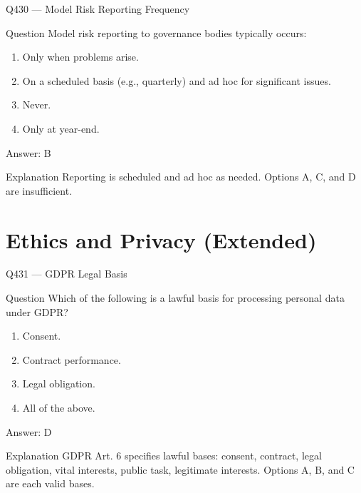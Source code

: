 \documentclass[aspectratio=169,8pt]{beamer}
\begin{document}
	\begin{frame}{Q430 --- Model Risk Reporting Frequency}
		\begin{block}{Question}
			Model risk reporting to governance bodies typically occurs:
			\begin{enumerate}
				\item Only when problems arise.
				\item On a scheduled basis (e.g., quarterly) and ad hoc for significant issues.
				\item Never.
				\item Only at year-end.
			\end{enumerate}
		\end{block}
		\begin{exampleblock}{Answer: B}\end{exampleblock}
		\begin{block}{Explanation}
			Reporting is scheduled and ad hoc as needed. Options A, C, and D are insufficient.
		\end{block}
	\end{frame}
	
	\section{Ethics and Privacy (Extended)}
	
	\begin{frame}{Q431 --- GDPR Legal Basis}
		\begin{block}{Question}
			Which of the following is a lawful basis for processing personal data under GDPR?
			\begin{enumerate}
				\item Consent.
				\item Contract performance.
				\item Legal obligation.
				\item All of the above.
			\end{enumerate}
		\end{block}
		\begin{exampleblock}{Answer: D}\end{exampleblock}
		\begin{block}{Explanation}
			GDPR Art. 6 specifies lawful bases: consent, contract, legal obligation, vital interests, public task, legitimate interests. Options A, B, and C are each valid bases.
		\end{block}
	\end{frame}
	
\end{document}
